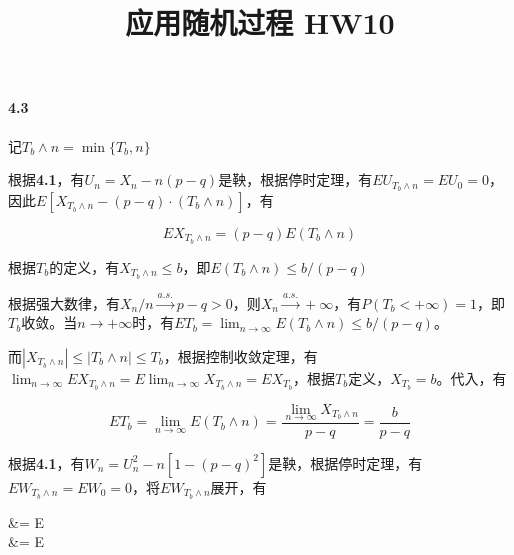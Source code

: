 \documentclass{../notes}
\title{应用随机过程 HW10}
\begin{document}
    \maketitle

    \paragraph*{4.3} 记$T_b\land n = \min\{T_b, n\}$

    \begin{subquestions}
        \item 根据\textbf{4.1}，有$U_n= X_n - n(p - q)$是鞅，根据停时定理，有$EU_{T_b\land n} = EU_{0} = 0$，因此$E\left[X_{T_b\land n} - (p - q)\cdot (T_b\land n)\right]$，有

        \begin{equation}
            EX_{T_b\land n} = (p-q)E(T_b\land n)
            \label{eq:4.3.1}
        \end{equation}

        根据$T_b$的定义，有$X_{T_b\land n}\leq b$，即$E(T_b\land n) \leq b/(p - q)$

        根据强大数律，有$X_n/n\xrightarrow{a.s.} p - q > 0$，则$X_n\xrightarrow{a.s.} +\infty$，有$P(T_b < +\infty) = 1$，即$T_b$收敛。当$n\rightarrow +\infty$时，有$ET_b = \lim_{n\rightarrow\infty}E(T_b\land n) \leq b/(p-q)$。

        而$\left|X_{T_b\land n}\right|\leq \left|T_b\land n\right|\leq T_b$，根据控制收敛定理，有$\lim_{n\rightarrow \infty}EX_{T_b\land n} = E\lim_{n\rightarrow \infty}X_{T_b\land n} = EX_{T_b}$，根据$T_b$定义，$X_{T_b} = b$。代入，有

        \begin{equation}
            ET_b = \lim_{n\rightarrow\infty}E(T_b\land n) = \frac{\lim_{n\rightarrow\infty }X_{T_b\land n}}{p-q} = \frac{b}{p-q}
        \end{equation}
        \setcounter{enumi}{2}
        \item 根据\textbf{4.1}，有$W_n = U_n^2 - n\left[1 - (p - q)^2\right]$是鞅，根据停时定理，有$EW_{T_b\land n} = EW_0 = 0$，将$EW_{T_b\land n}$展开，有

        \begin{derive}[EW_{T_b\land n}]
            &= E \\
            &= E
        \end{derive}


\end{subquestions}
\end{document}
